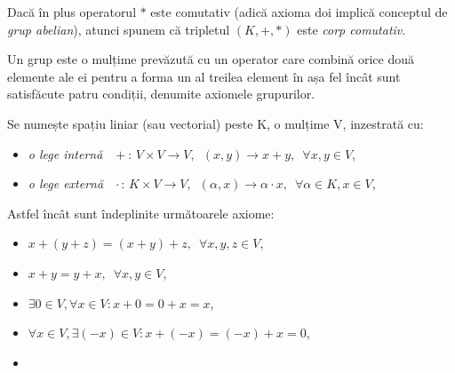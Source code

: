 Dacă în plus operatorul $*$ este comutativ (adică axioma doi implică conceptul de \textit{grup abelian}), atunci spunem că tripletul $(K, +, *)$ este \textit{corp comutativ}.

Un grup este o mulțime prevăzută cu un operator care combină orice două elemente ale ei pentru a forma un al treilea element în așa fel încât sunt satisfăcute patru condiții, denumite axiomele grupurilor.

Se numește spațiu liniar (sau vectorial) peste K, o mulțime V, inzestrată cu:
\begin{itemize}
    \item \textit{o lege internă} $\enspace+$: \enspace$V \times V \rightarrow V,\enspace (x, y) \rightarrow x + y,\enspace \forall x,y \in V$,
    \item \textit{o lege externă} $\enspace\cdot$: $K \times V \rightarrow V, \enspace (\alpha, x) \rightarrow \alpha \cdot x, \enspace \forall \alpha \in K, x \in V$, 
\end{itemize}

Astfel încât sunt îndeplinite următoarele axiome:

\begin{itemize}
    \item $x + (y + z) = (x + y) + z,  \enspace \forall x,y,z \in V$,
    \item $x + y = y + x, \enspace \forall x, y \in V$,
    \item $\exists0 \in V, \forall x \in V: x + 0 = 0 + x = x$,
    \item $\forall x \in V, \exists (-x) \in V: x + (-x) = (-x) + x = 0$,
    \item $$
\end{itemize}